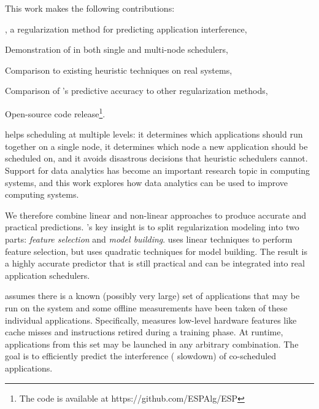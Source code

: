 This work makes the following contributions:
\begin{inparaenum}[1)]
\item \SYSTEMESP{}, a regularization method for predicting application
  interference,
\item Demonstration of \SYSTEMESP{} in both single and multi-node
  schedulers,
\item Comparison to existing heuristic techniques on real systems,
\item Comparison of \SYSTEMESP{}'s predictive accuracy to other
  regularization methods,
\item Open-source code release\footnote{The code is available at
    https://github.com/ESPAlg/ESP}.
\end{inparaenum}
\SYSTEMESP{} helps scheduling at multiple levels: it determines which
applications should run together on a single node, it determines which
node a new application should be scheduled on, and it avoids
disastrous decisions that heuristic schedulers cannot.  Support for
data analytics has become an important research topic in computing
systems, and this work explores how data analytics can be used to
improve computing systems.


We therefore combine linear and non-linear approaches to produce
accurate and practical predictions.
\SYSTEMESP{}'s key insight is to split regularization modeling into two
parts: \emph{feature selection} and \emph{model building}.  \SYSTEMESP{}
uses linear techniques to perform feature selection, but uses
quadratic techniques for model building.  The result is a highly
accurate predictor that is still practical and can be integrated into
real application schedulers.

\SYSTEMESP{} assumes there is a known (possibly very large) set of
applications that may be run on the system and some offline
measurements have been taken of these individual applications.
Specifically, \SYSTEMESP{} measures low-level hardware features like
cache misses and instructions retired during a training phase.  At
runtime, applications from this set may be launched in any arbitrary
combination.  The goal is to efficiently predict the interference (\ie
slowdown) of co-scheduled applications.

